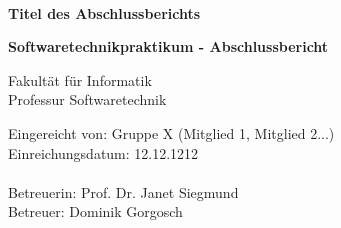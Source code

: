 \documentclass[a4paper, 12pt, oneside, BCOR1cm,toc=chapterentrywithdots]{scrbook}
\begin{document}
%
%

\begin{titlepage}

{
    \begin{center}
        \\
    \end{center}
    \vspace{0.5cm}
}

\begin{center}

\LARGE{\textbf{Titel des Abschlussberichts}}\\
\vspace{1cm}


\Large{\textbf{Softwaretechnikpraktikum - Abschlussbericht}}\\ 
\vspace{1cm}

Fakultät für Informatik\\
Professur Softwaretechnik
\end{center}
\vspace{3cm}
Eingereicht von: Gruppe X (Mitglied 1, Mitglied 2...)\\
Einreichungsdatum: 12.12.1212\\
\vspace{0.3cm}\\
Betreuerin: Prof. Dr. Janet Siegmund \\
Betreuer: Dominik Gorgosch

\end{titlepage}
\end{document}
